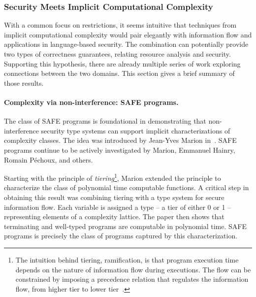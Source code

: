 \subsubsection{Security Meets Implicit Computational Complexity}
\label{icc-sec}

With a common focus on restrictions, it seems intuitive that 
techniques from implicit computational complexity would pair elegantly with information flow and applications in language-based security.
The combination can potentially provide two types of correctness guarantees, relating resource analysis and security.
Supporting this hypothesis, there are already multiple series of work exploring connections between the two domains.
This section gives a brief summary of those results.

\paragraph*{Complexity via non-interference: SAFE programs.}
The class of SAFE programs is foundational in demonstrating that non-interference security type systems
can support implicit characterizations of complexity classes.
The idea was introduced by Jean-Yves Marion in~\cite{marion2011}.
SAFE programs continue to be actively investigated by Marion, Emmanuel Hainry, Romain Péchoux, and others.

Starting with the principle of {\emph{tiering}}\footnote{
The intuition behind tiering, \aka ramification, is that program execution time depends on the nature of information flow during executions.
The flow can be constrained by imposing a precedence relation that regulates the information flow,
\eg from higher tier to lower tier~\cite{leivant1995, leivant2013}.},
Marion extended the principle to characterize the class of {polynomial time computable functions}.
A critical step in obtaining this result was combining tiering with a type system 
for secure information flow.
Each variable is assigned a type -- a {tier} of either 0 or 1 -- representing elements of a complexity lattice.
The paper then shows that terminating and well-typed programs are computable in polynomial time.
SAFE programs is precisely the class of programs captured by this characterization.


